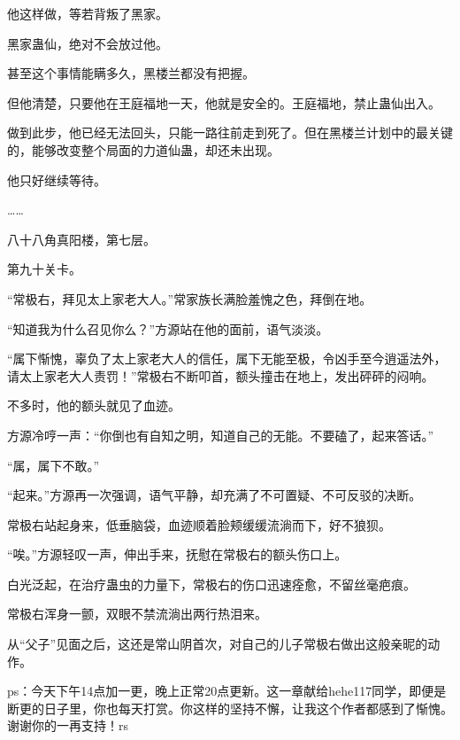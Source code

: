 \begin{this_body}
他这样做，等若背叛了黑家。

黑家蛊仙，绝对不会放过他。

甚至这个事情能瞒多久，黑楼兰都没有把握。

但他清楚，只要他在王庭福地一天，他就是安全的。王庭福地，禁止蛊仙出入。

做到此步，他已经无法回头，只能一路往前走到死了。但在黑楼兰计划中的最关键的，能够改变整个局面的力道仙蛊，却还未出现。

他只好继续等待。

……

八十八角真阳楼，第七层。

第九十关卡。

“常极右，拜见太上家老大人。”常家族长满脸羞愧之色，拜倒在地。

“知道我为什么召见你么？”方源站在他的面前，语气淡淡。

“属下惭愧，辜负了太上家老大人的信任，属下无能至极，令凶手至今逍遥法外，请太上家老大人责罚！”常极右不断叩首，额头撞击在地上，发出砰砰的闷响。

不多时，他的额头就见了血迹。

方源冷哼一声：“你倒也有自知之明，知道自己的无能。不要磕了，起来答话。”

“属，属下不敢。”

“起来。”方源再一次强调，语气平静，却充满了不可置疑、不可反驳的决断。

常极右站起身来，低垂脑袋，血迹顺着脸颊缓缓流淌而下，好不狼狈。

“唉。”方源轻叹一声，伸出手来，抚慰在常极右的额头伤口上。

白光泛起，在治疗蛊虫的力量下，常极右的伤口迅速痊愈，不留丝毫疤痕。

常极右浑身一颤，双眼不禁流淌出两行热泪来。

从“父子”见面之后，这还是常山阴首次，对自己的儿子常极右做出这般亲昵的动作。

ps：今天下午14点加一更，晚上正常20点更新。这一章献给hehe117同学，即便是断更的日子里，你也每天打赏。你这样的坚持不懈，让我这个作者都感到了惭愧。谢谢你的一再支持！rs

\end{this_body}

